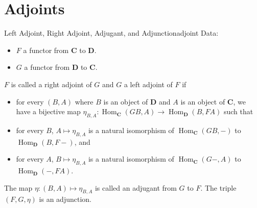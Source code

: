 \documentclass{article}
\begin{document}
\section{Adjoints}

\begin{definition}{Left Adjoint, Right Adjoint, Adjugant, and Adjunction}{adjoint}
    Data:
    \begin{itemize}
        \item $F$ a functor from $\mathbf{C}$ to $\mathbf{D}$.
        \item $G$ a functor from $\mathbf{D}$ to $\mathbf{C}$.
    \end{itemize}
    $F$ is called a right adjoint of $G$ and $G$ a left adjoint of $F$ if
    \begin{itemize}
        \item for every $(B,A)$ where $B$ is an object of $\mathbf{D}$ and $A$ is an object of $\mathbf{C}$,
        we have a bijective map $\eta_{B,A}: \operatorname{Hom}_{\mathbf{C}}(GB,A) \rightarrow \operatorname{Hom}_{\mathbf{D}}(B,FA)$ such that
        \item for every $B$, $A \mapsto \eta_{B,A}$ is a natural isomorphism of $\operatorname{Hom}_{\mathbf{C}}(GB, -)$ to $\operatorname{Hom}_{\mathbf{D}}(B, F-)$, and
        \item for every $A$, $B \mapsto \eta_{B,A}$ is a natural isomorphism of $\operatorname{Hom}_{\mathbf{C}}(G-, A)$ to $\operatorname{Hom}_{\mathbf{D}}(-, FA)$.
    \end{itemize}
    The map $\eta: (B,A) \mapsto \eta_{B,A}$ is called an adjugant from $G$ to $F$.
    The triple $(F,G,\eta)$ is an adjunction.
\end{definition}
\end{document}
